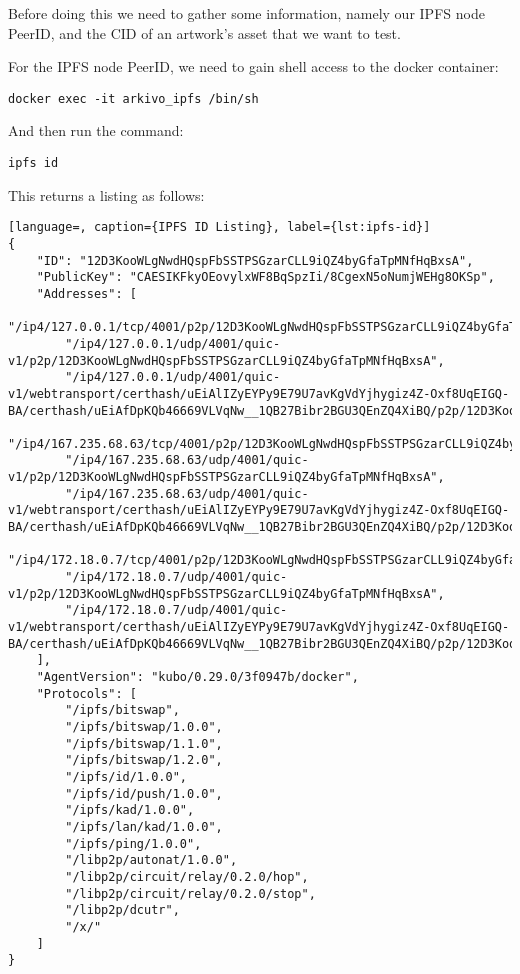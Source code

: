 
Before doing this we need to gather some information, namely our IPFS node PeerID, and the CID of an artwork's asset that we want to test.

For the IPFS node PeerID, we need to gain shell access to the docker container:

\texttt{docker exec -it arkivo\_ipfs /bin/sh}

And then run the command:

\texttt{ipfs id}

This returns a listing as follows:

\begin{lstlisting}[language=, caption={IPFS ID Listing}, label={lst:ipfs-id}] 
{
	"ID": "12D3KooWLgNwdHQspFbSSTPSGzarCLL9iQZ4byGfaTpMNfHqBxsA",
	"PublicKey": "CAESIKFkyOEovylxWF8BqSpzIi/8CgexN5oNumjWEHg8OKSp",
	"Addresses": [
		"/ip4/127.0.0.1/tcp/4001/p2p/12D3KooWLgNwdHQspFbSSTPSGzarCLL9iQZ4byGfaTpMNfHqBxsA",
		"/ip4/127.0.0.1/udp/4001/quic-v1/p2p/12D3KooWLgNwdHQspFbSSTPSGzarCLL9iQZ4byGfaTpMNfHqBxsA",
		"/ip4/127.0.0.1/udp/4001/quic-v1/webtransport/certhash/uEiAlIZyEYPy9E79U7avKgVdYjhygiz4Z-Oxf8UqEIGQ-BA/certhash/uEiAfDpKQb46669VLVqNw__1QB27Bibr2BGU3QEnZQ4XiBQ/p2p/12D3KooWLgNwdHQspFbSSTPSGzarCLL9iQZ4byGfaTpMNfHqBxsA",
		"/ip4/167.235.68.63/tcp/4001/p2p/12D3KooWLgNwdHQspFbSSTPSGzarCLL9iQZ4byGfaTpMNfHqBxsA",
		"/ip4/167.235.68.63/udp/4001/quic-v1/p2p/12D3KooWLgNwdHQspFbSSTPSGzarCLL9iQZ4byGfaTpMNfHqBxsA",
		"/ip4/167.235.68.63/udp/4001/quic-v1/webtransport/certhash/uEiAlIZyEYPy9E79U7avKgVdYjhygiz4Z-Oxf8UqEIGQ-BA/certhash/uEiAfDpKQb46669VLVqNw__1QB27Bibr2BGU3QEnZQ4XiBQ/p2p/12D3KooWLgNwdHQspFbSSTPSGzarCLL9iQZ4byGfaTpMNfHqBxsA",
		"/ip4/172.18.0.7/tcp/4001/p2p/12D3KooWLgNwdHQspFbSSTPSGzarCLL9iQZ4byGfaTpMNfHqBxsA",
		"/ip4/172.18.0.7/udp/4001/quic-v1/p2p/12D3KooWLgNwdHQspFbSSTPSGzarCLL9iQZ4byGfaTpMNfHqBxsA",
		"/ip4/172.18.0.7/udp/4001/quic-v1/webtransport/certhash/uEiAlIZyEYPy9E79U7avKgVdYjhygiz4Z-Oxf8UqEIGQ-BA/certhash/uEiAfDpKQb46669VLVqNw__1QB27Bibr2BGU3QEnZQ4XiBQ/p2p/12D3KooWLgNwdHQspFbSSTPSGzarCLL9iQZ4byGfaTpMNfHqBxsA"
	],
	"AgentVersion": "kubo/0.29.0/3f0947b/docker",
	"Protocols": [
		"/ipfs/bitswap",
		"/ipfs/bitswap/1.0.0",
		"/ipfs/bitswap/1.1.0",
		"/ipfs/bitswap/1.2.0",
		"/ipfs/id/1.0.0",
		"/ipfs/id/push/1.0.0",
		"/ipfs/kad/1.0.0",
		"/ipfs/lan/kad/1.0.0",
		"/ipfs/ping/1.0.0",
		"/libp2p/autonat/1.0.0",
		"/libp2p/circuit/relay/0.2.0/hop",
		"/libp2p/circuit/relay/0.2.0/stop",
		"/libp2p/dcutr",
		"/x/"
	]
}
\end{lstlisting}

